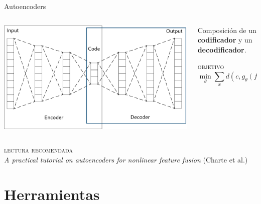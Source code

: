 \documentclass[13.5pt,aspectratio=169]{beamer}
\begin{document}
     \begin{frame}{Autoencoders}
     
     \begin{columns}
      \begin{column}{.6\linewidth}
         \includegraphics[width=\linewidth]{images/autoencoder.png}
      \end{column}%
      \begin{column}{.4\linewidth}
         Composición de un \textbf{\color{colorblue}codificador} y un \textbf{\color{colorblue}decodificador}.
         
         \vspace{1em}
         \textsc{\color{colorblue}objetivo}
         \[\min_{\theta}\sum_x d(c,g_{\theta}(f_{\theta}(x)))\]
      \end{column}
     \end{columns}
      \vfill
     \textsc{\color{colorblue}lectura recomendada}\\
     \textit{A practical tutorial on autoencoders for nonlinear feature fusion} (Charte {\scriptsize et al.})

     \end{frame}
     
     
     \section{Herramientas}
     
\end{document}
